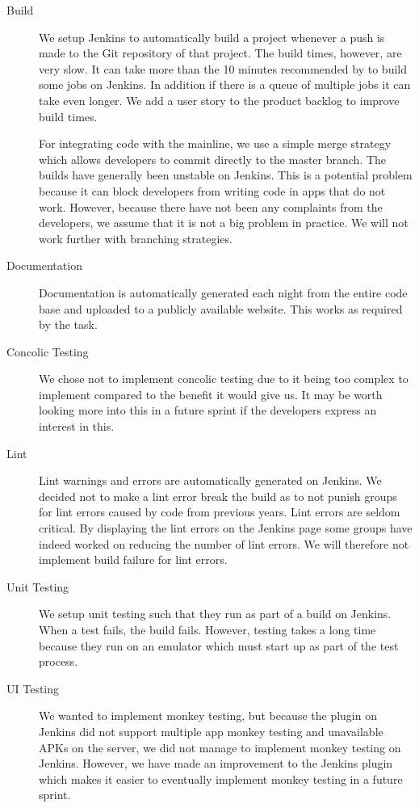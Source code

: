 \begin{description}
  \item[Build] We setup Jenkins to automatically build a project whenever a push is made to the Git repository of that project. The build times, however, are very slow. It can take more than the 10 minutes recommended by \textcite{beck2004} to build some jobs on Jenkins. In addition if there is a queue of multiple jobs it can take even longer. We add a user story to the product backlog to improve build times.

  For integrating code with the mainline, we use a simple merge strategy which allows developers to commit directly to the master branch. The builds have generally been unstable on Jenkins. This is a potential problem because it can block developers from writing code in apps that do not work. However, because there have not been any complaints from the developers, we assume that it is not a big problem in practice. We will not work further with branching strategies.
  \item[Documentation] Documentation is automatically generated each night from the entire code base and uploaded to a publicly available website. This works as required by the task.
  \item[Concolic Testing] We chose not to implement concolic testing due to it being too complex to implement compared to the benefit it would give us. It may be worth looking more into this in a future sprint if the developers express an interest in this.
  \item[Lint] Lint warnings and errors are automatically generated on Jenkins. We decided not to make a lint error break the build as to not punish groups for lint errors caused by code from previous years. Lint errors are seldom critical. By displaying the lint errors on the Jenkins page some groups have indeed worked on reducing the number of lint errors. We will therefore not implement build failure for lint errors.
  \item[Unit Testing] We setup unit testing such that they run as part of a build on Jenkins. When a test fails, the build fails. However, testing takes a long time because they run on an emulator which must start up as part of the test process.
  \item[UI Testing] We wanted to implement monkey testing, but because the plugin on Jenkins did not support multiple app monkey testing and unavailable APKs on the server, we did not manage to implement monkey testing on Jenkins. However, we have made an improvement to the Jenkins plugin which makes it easier to eventually implement monkey testing in a future sprint.
\end{description}

